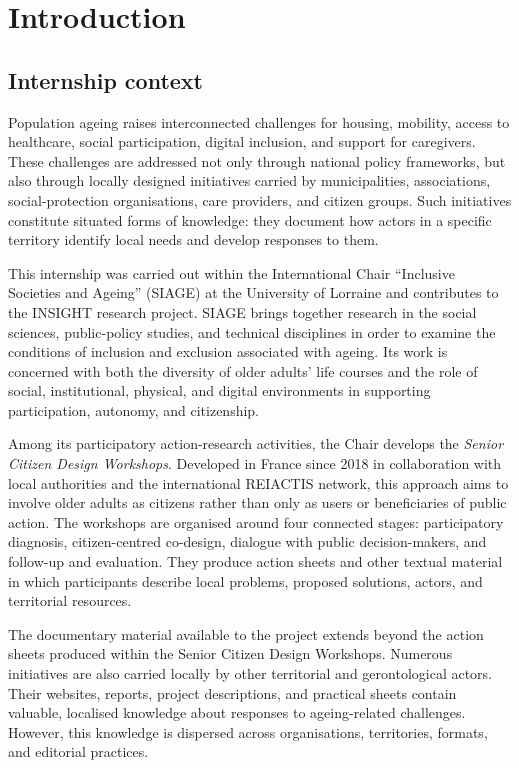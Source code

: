 \chapter{Introduction}

\section{Internship context}

Population ageing raises interconnected challenges for housing, mobility, access
to healthcare, social participation, digital inclusion, and support for caregivers.
These challenges are addressed not only through national policy frameworks, but
also through locally designed initiatives carried by municipalities, associations,
social-protection organisations, care providers, and citizen groups. Such
initiatives constitute situated forms of knowledge: they document how actors in a
specific territory identify local needs and develop responses to them.

This internship was carried out within the International Chair ``Inclusive
Societies and Ageing'' (SIAGE) at the University of Lorraine and contributes to
the INSIGHT research project. SIAGE brings together research in the social
sciences, public-policy studies, and technical disciplines in order to examine the
conditions of inclusion and exclusion associated with ageing. Its work is concerned
with both the diversity of older adults' life courses and the role of social,
institutional, physical, and digital environments in supporting participation,
autonomy, and citizenship.

Among its participatory action-research activities, the Chair develops the
\textit{Senior Citizen Design Workshops}. Developed in France since 2018 in
collaboration with local authorities and the international REIACTIS network, this
approach aims to involve older adults as citizens rather than only as users or
beneficiaries of public action. The workshops are organised around four connected
stages: participatory diagnosis, citizen-centred co-design, dialogue with public
decision-makers, and follow-up and evaluation. They produce action sheets and
other textual material in which participants describe local problems, proposed
solutions, actors, and territorial resources.

The documentary material available to the project extends beyond the action sheets
produced within the Senior Citizen Design Workshops. Numerous initiatives are also
carried locally by other territorial and gerontological actors. Their websites,
reports, project descriptions, and practical sheets contain valuable, localised
knowledge about responses to ageing-related challenges. However, this knowledge is
dispersed across organisations, territories, formats, and editorial practices.

